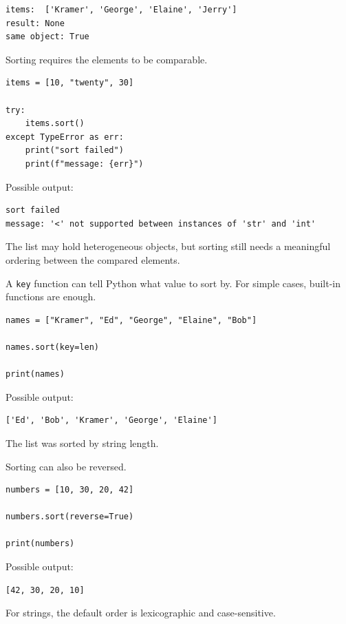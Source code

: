 \begin{verbatim}
items:  ['Kramer', 'George', 'Elaine', 'Jerry']
result: None
same object: True
\end{verbatim}

Sorting requires the elements to be comparable.

\begin{verbatim}
items = [10, "twenty", 30]

try:
    items.sort()
except TypeError as err:
    print("sort failed")
    print(f"message: {err}")
\end{verbatim}

Possible output:

\begin{verbatim}
sort failed
message: '<' not supported between instances of 'str' and 'int'
\end{verbatim}

The list may hold heterogeneous objects, but sorting still needs a meaningful ordering between the compared elements.

A \texttt{key} function can tell Python what value to sort by. For simple cases, built-in functions are enough.

\begin{verbatim}
names = ["Kramer", "Ed", "George", "Elaine", "Bob"]

names.sort(key=len)

print(names)
\end{verbatim}

Possible output:

\begin{verbatim}
['Ed', 'Bob', 'Kramer', 'George', 'Elaine']
\end{verbatim}

The list was sorted by string length.

Sorting can also be reversed.

\begin{verbatim}
numbers = [10, 30, 20, 42]

numbers.sort(reverse=True)

print(numbers)
\end{verbatim}

Possible output:

\begin{verbatim}
[42, 30, 20, 10]
\end{verbatim}

For strings, the default order is lexicographic and case-sensitive.


